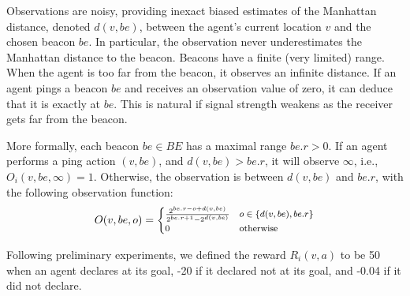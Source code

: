 \documentclass[letterpaper]{article} %
\newcommand{\roni}[1]{ }
\begin{document}
 
Observations are noisy, providing inexact biased estimates of the Manhattan distance, denoted $d(v,be)$, between the agent's current location $v$ and the chosen beacon $be$. %
In particular, the observation never underestimates the Manhattan distance to the beacon. Beacons have a finite (very limited) range. When the agent is too far from the beacon, it observes an infinite distance. 
If an agent pings a beacon $be$ and receives an observation value of zero, it can deduce that it is exactly  at $be$. This is natural if signal strength weakens as the receiver gets far from the beacon. 

More formally, each beacon $be\in BE$ has a maximal range $be.r>0$. 
If an agent performs a ping action $(v,be)$, and $d(v,be)>be.r$, it will observe $\infty$, i.e., $O_i(v,be,\infty)=1$. 
Otherwise, the observation is between $d(v, be)$ and $be.r$, with the following observation function: 
\begin{equation}
\footnotesize
    O(v,be,o) = 
    \begin{cases}
        \frac{2^{be.r-o+d(v,be)}}{2^{be.r+1}-2^{d(v,be)}} & o\in\{d(v,be), be.r\} \\
        0 & \text{otherwise}
    \end{cases}
\end{equation}

Following preliminary experiments, we defined the reward $R_i(v,a)$ to be 50 when an agent declares at its goal, -20 if it declared not at its goal, and -0.04 if it did not declare. 



\end{document}
